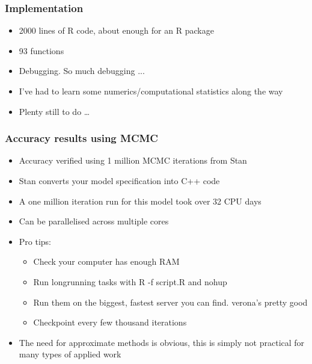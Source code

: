 \documentclass{beamer}
\begin{document}
\begin{frame}
\frametitle{Implementation}
\begin{itemize}
\item 2000 lines of R code, about enough for an R package
\item 93 functions
\item Debugging. So much debugging ...
\item I've had to learn some numerics/computational statistics along the
way
\item Plenty still to do \ldots
\end{itemize}
\end{frame}

\begin{frame}
\frametitle{Accuracy results using MCMC}
\begin{itemize}
\item Accuracy verified using 1 million MCMC iterations from Stan
\item Stan converts your model specification into C++ code
\item A one million iteration run for this model took over 32 CPU days
\item Can be parallelised across multiple cores
\item Pro tips:
\begin{itemize}
\item Check your computer has enough RAM
\item Run longrunning tasks with R -f script.R and nohup
\item Run them on the biggest, fastest server you can find. verona's pretty good
\item Checkpoint every few thousand iterations
\end{itemize}
\item The need for approximate methods is obvious, this is simply not
practical for many types of applied work
\end{itemize}
\end{frame}
\end{document}
